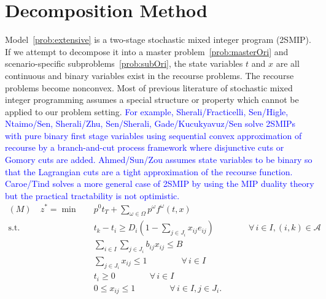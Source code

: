 \documentclass[11pt]{article}
\begin{document}
	\section{Decomposition Method} \label{sec:decomposition}
	Model~\eqref{prob:extensive} is a two-stage stochastic mixed integer program (2SMIP). If we attempt to decompose it into a master problem~\eqref{prob:masterOri} and scenario-specific subproblems~\eqref{prob:subOri}, the state variables \(t\) and \(x\) are all continuous and binary variables exist in the recourse problems. The recourse problems become nonconvex. Most of previous literature of stochastic mixed integer programming assumes a special structure or property which cannot be applied to our problem setting. \textcolor{blue}{For example, Sherali/Fracticelli, Sen/Higle, Ntaimo/Sen, Sherali/Zhu, Sen/Sherali, Gade/Kucukyavuz/Sen solve 2SMIPs with pure binary first stage variables using sequential convex approximation of recourse by a branch-and-cut process framework where disjunctive cuts or Gomory cuts are added. Ahmed/Sun/Zou assumes state variables to be binary so that the Lagrangian cuts are a tight approximation of the recourse function. Caroe/Tind solves a more general case of 2SMIP by using the MIP duality theory but the practical tractability is not optimistic. }
	\begin{subequations}
		\label{prob:masterOri}
		\begin{align}
		(M) \quad z^* = \min \quad &p^0 t_T + \sum_{\omega \in \Omega} p^\omega f^\omega(t,x)\\
		\text{s.t.} \quad & t_k - t_i \geq D_{i}(1 - \sum_{j \in J_i} x_{ij} e_{ij}) \qquad \qquad \forall \,i \in I, (i,k) \in \mathcal{A} \label{cons:MSep}\\
		& \sum_{i \in I} \sum_{j \in J_i} b_{ij}x_{ij} \leq B  \label{cons:MBudget}\\
		& \sum_{j \in J_i} x_{ij} \leq 1  \qquad \qquad \forall \,i \in I \label{cons:MSingleBudget}\\
		& t_i \geq 0 \qquad \qquad \forall \,i \in I\\
		& 0 \leq x_{ij} \leq 1 \qquad \qquad \forall \,i \in I, j \in J_i.
		\end{align}
	\end{subequations}
\end{document}
